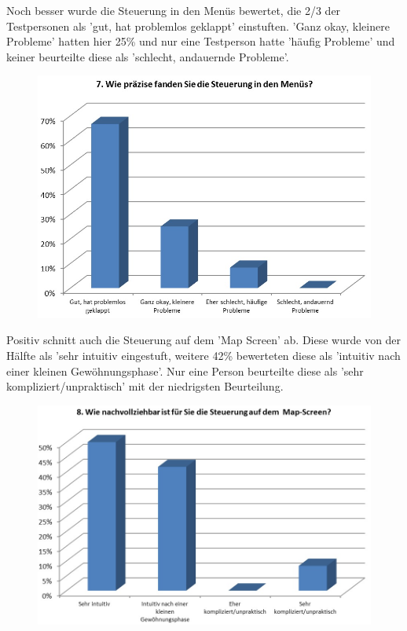 \documentclass[extern,palatino]{cgBA}
\begin{document}
Noch besser wurde die Steuerung in den Menüs bewertet, die 2/3 der Testpersonen als 'gut, hat problemlos geklappt' einstuften. 'Ganz okay, kleinere Probleme' hatten hier 25\% und nur eine Testperson hatte 'häufig Probleme' und keiner beurteilte diese als 'schlecht, andauernde Probleme'.
\begin{figure}[H]
	\centering
	\includegraphics[width=1\textwidth]{table6.jpg}
\end{figure}
Positiv schnitt auch die Steuerung auf dem 'Map Screen' ab. Diese wurde von der Hälfte als 'sehr intuitiv eingestuft, weitere 42\% bewerteten diese als 'intuitiv nach einer kleinen Gewöhnungsphase'. Nur eine Person beurteilte diese als 'sehr kompliziert/unpraktisch' mit der niedrigsten Beurteilung.
\begin{figure}[H]
	\centering
	\includegraphics[width=1\textwidth]{table7.jpg}
\end{figure}
\end{document}
